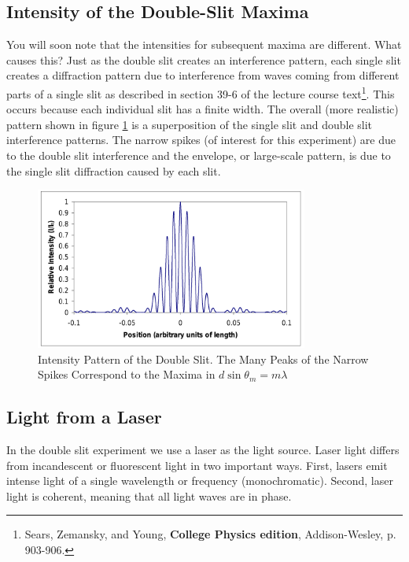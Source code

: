\subsection{Intensity of the Double-Slit Maxima}
You will soon note that the intensities for subsequent maxima are different. What causes this? Just as the double slit creates an interference pattern, each single slit creates a diffraction pattern due to interference from waves coming from different parts of a single slit as described in section 39-6 of the lecture course text\footnote{Sears, Zemansky, and Young, \textbf{College Physics  edition}, Addison-Wesley, p. 903-906.}. This occurs because each individual slit has a finite width. The overall (more realistic) pattern shown in figure {\ref{fig:intensity}} is a superposition of the single slit and double slit interference patterns. The narrow spikes (of interest for this experiment) are due to the double slit interference and the envelope, or large-scale pattern, is due to the single slit diffraction caused by each slit.
\begin{figure}[h]
\centering
\includegraphics[width=0.8\textwidth]{./Exp7/pic/image6.png}
\caption{Intensity Pattern of the Double Slit. The Many Peaks of the Narrow Spikes Correspond to the Maxima in $d\sin\theta_{m}=m\lambda$}
\label{fig:intensity}
\end{figure}

\subsection{Light from a Laser}
In the double slit experiment we use a laser as the light source. Laser light differs from incandescent or fluorescent light in two important ways. First, lasers emit intense light of a single wavelength or frequency (monochromatic). Second, laser light is coherent, meaning that all light waves are in phase.\myskip

